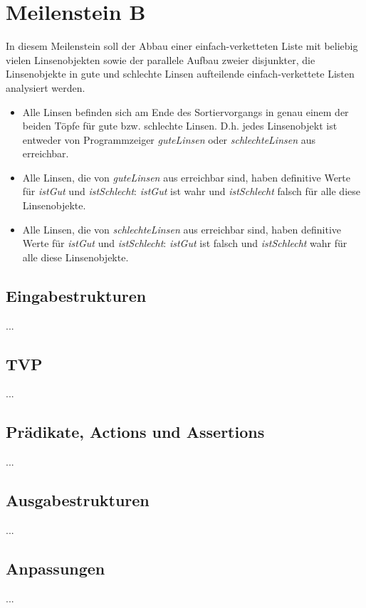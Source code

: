 \section{Meilenstein B}
In diesem Meilenstein soll der Abbau einer einfach-verketteten Liste mit beliebig vielen Linsenobjekten sowie der parallele Aufbau zweier disjunkter, die Linsenobjekte in gute und schlechte Linsen aufteilende einfach-verkettete Listen analysiert werden.
\begin{itemize}
	\item Alle Linsen befinden sich am Ende des Sortiervorgangs in genau einem der beiden Töpfe für gute bzw. schlechte Linsen. D.h. jedes Linsenobjekt ist entweder von Programmzeiger \emph{guteLinsen} oder \emph{schlechteLinsen} aus erreichbar.
	\item Alle Linsen, die von \emph{guteLinsen} aus erreichbar sind, haben definitive Werte für \emph{istGut} und \emph{istSchlecht}: \emph{istGut} ist wahr und \emph{istSchlecht} falsch für alle diese Linsenobjekte.
	\item Alle Linsen, die von \emph{schlechteLinsen} aus erreichbar sind, haben definitive Werte für \emph{istGut} und \emph{istSchlecht}: \emph{istGut} ist falsch und \emph{istSchlecht} wahr für alle diese Linsenobjekte.
\end{itemize}


\subsection{Eingabestrukturen}
...


\subsection{TVP}
...


\subsection{Prädikate, Actions und Assertions}
...


\subsection{Ausgabestrukturen}
...


\subsection{Anpassungen}
...
